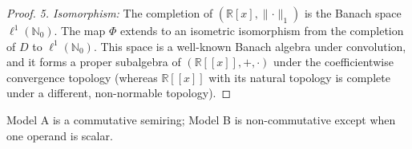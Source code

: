 \begin{proof}
\textit{5. Isomorphism:}
The completion of \((\mathbb{R}[x], \lVert \cdot \rVert_1)\) is the Banach space \(\ell^1(\mathbb{N}_0)\). The map \(\Phi\) extends to an isometric isomorphism from the completion of \(D\) to \(\ell^1(\mathbb{N}_0)\). This space is a well-known Banach algebra under convolution, and it forms a proper subalgebra of \((\mathbb R[[x]], +, \cdot)\) under the coefficientwise convergence topology (whereas \(\mathbb R[[x]]\) with its natural topology is complete under a different, non-normable topology).
\end{proof}

\begin{lemma}
Model A is a commutative semiring; Model B is non-commutative except when one operand is scalar.
\end{lemma}
